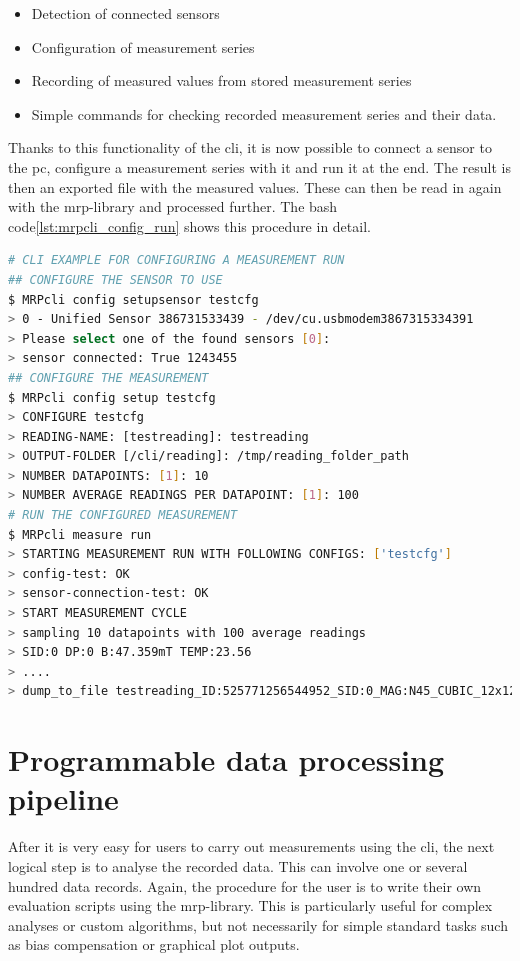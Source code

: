 \begin{itemize}
\tightlist
\item
  Detection of connected sensors
\item
  Configuration of measurement series
\item
  Recording of measured values from stored measurement series
\item
  Simple commands for checking recorded measurement series and their
  data.
\end{itemize}

Thanks to this functionality of the \gls{cli}, it is now possible to
connect a sensor to the \gls{pc}, configure a measurement series with it
and run it at the end. The result is then an exported file with the
measured values. These can then be read in again with the
\gls{mrp}-library and processed further. The bash
code\ref{lst:mrpcli_config_run} shows this procedure in detail.

\begin{lstlisting}[language=bash, caption={CLI example for configuring a measurement run}, label=lst:mrpcli_config_run]
# CLI EXAMPLE FOR CONFIGURING A MEASUREMENT RUN
## CONFIGURE THE SENSOR TO USE
$ MRPcli config setupsensor testcfg
> 0 - Unified Sensor 386731533439 - /dev/cu.usbmodem3867315334391
> Please select one of the found sensors [0]:
> sensor connected: True 1243455
## CONFIGURE THE MEASUREMENT
$ MRPcli config setup testcfg
> CONFIGURE testcfg
> READING-NAME: [testreading]: testreading
> OUTPUT-FOLDER [/cli/reading]: /tmp/reading_folder_path
> NUMBER DATAPOINTS: [1]: 10
> NUMBER AVERAGE READINGS PER DATAPOINT: [1]: 100
# RUN THE CONFIGURED MEASUREMENT
$ MRPcli measure run
> STARTING MEASUREMENT RUN WITH FOLLOWING CONFIGS: ['testcfg']
> config-test: OK
> sensor-connection-test: OK
> START MEASUREMENT CYCLE
> sampling 10 datapoints with 100 average readings
> SID:0 DP:0 B:47.359mT TEMP:23.56
> ....
> dump_to_file testreading_ID:525771256544952_SID:0_MAG:N45_CUBIC_12x12x12.mag.json
\end{lstlisting}

\hypertarget{programmable-data-processing-pipeline}{%
\section{Programmable data processing
pipeline}\label{programmable-data-processing-pipeline}}

After it is very easy for users to carry out measurements using the
\gls{cli}, the next logical step is to analyse the recorded data. This
can involve one or several hundred data records. Again, the procedure
for the user is to write their own evaluation scripts using the
\gls{mrp}-library. This is particularly useful for complex analyses or
custom algorithms, but not necessarily for simple standard tasks such as
bias compensation or graphical plot outputs.

